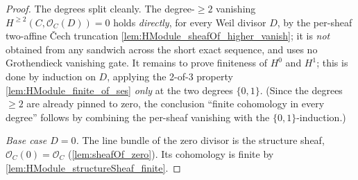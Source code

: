 \begin{proof}
        \leanok
  The degrees split cleanly. The degree-\(\ge 2\) vanishing
  \(H^{\ge 2}(C, \mathcal O_C(D)) = 0\) holds \emph{directly}, for every
  Weil divisor \(D\), by the per-sheaf two-affine Čech truncation
  \cref{lem:HModule_sheafOf_higher_vanish}; it is \emph{not} obtained
  from any sandwich across the short exact sequence, and uses no
  Grothendieck vanishing gate. It remains to prove finiteness of
  \(H^0\) and \(H^1\); this is done by induction on \(D\), applying the
  2-of-3 property \cref{lem:HModule_finite_of_ses} \emph{only} at the
  two degrees \(\{0, 1\}\). (Since the degrees \(\ge 2\) are already
  pinned to zero, the conclusion ``finite cohomology in every degree''
  follows by combining the per-sheaf vanishing with the
  \(\{0, 1\}\)-induction.)

  \emph{Base case \(D = 0\).} The line bundle of the zero divisor is the
  structure sheaf, \(\mathcal O_C(0) = \mathcal O_C\)
  (\cref{lem:sheafOf_zero}). Its cohomology is finite by
  \cref{lem:HModule_structureSheaf_finite}.


\end{proof}
